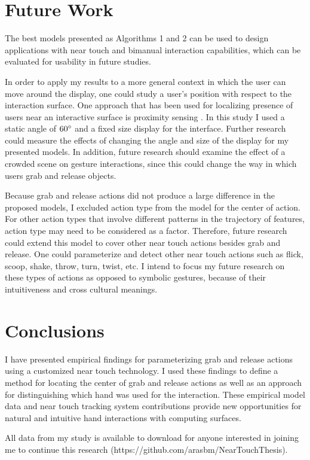 \label{concl}

\section{Future Work}
The best models presented as Algorithms 1 and 2 can be used to design applications with near touch and bimanual interaction capabilities, which can be evaluated for usability in future studies.

In order to apply my results to a more general context in which the user can move around the display, one could study a user's position with respect to the interaction surface.
One approach that has been used for localizing presence of users near an interactive surface is proximity sensing \cite{Annett:2011:MPAMT}.
In this study I used a static angle of $60\degree$ and a fixed size display for the interface. 
Further research could measure the effects of changing the angle and size of the display for my presented models. In addition, future research should examine the effect of a crowded scene on gesture interactions, since this could change the way in which users grab and release objects.

Because grab and release actions did not produce a large difference in the proposed models, I excluded action type from the model for the center of action.
For other action types that involve different patterns in the trajectory of features, action type may need to be considered as a factor.
Therefore, future research could extend this model to cover other near touch actions besides grab and release.  
One could parameterize and detect other near touch actions such as flick, scoop, shake, throw, turn, twist, etc.
I intend to focus my future research on these types of actions as opposed to symbolic gestures, because of their intuitiveness and cross cultural meanings.

\section{Conclusions}
I have presented empirical findings for parameterizing grab and release actions using a customized near touch technology. 
I used these findings to define a method for locating the center of grab and release actions as well as an approach for distinguishing which hand was used for the interaction.
These empirical model data and near touch tracking system contributions provide new opportunities for natural and intuitive hand interactions with computing surfaces. 

All data from my study is available to download for anyone interested in joining
me to continue this research (https://github.com/arasbm/NearTouchThesis).

